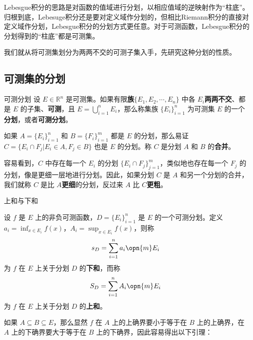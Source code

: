 

Lebesgue积分的思路是对函数的值域进行分划，以相应值域的逆映射作为“柱底”。归根到底，Lebesuge积分还是要对定义域作分划的，但相比Riemann积分的直接对定义域作分划，Lebesgue积分的分划方式更任意。对于可测函数，Lebesgue积分的分划得到的“柱底”都是可测集。

我们就从将可测集划分为两两不交的可测子集入手，先研究这种分划的性质。

\subsection{可测集的分划}

\begin{definition}{可测分划}
设 $E\in\mathbb{R}^n$ 是可测集。如果有限\textbf{族}$\{E_1, E_2, \cdots, E_n\}$ 中各 $E_i$\textbf{两两不交}、都是 $E$ 的子集、\textbf{可测}，且 $E=\bigcup^n_{i=1}E_i$，那么称集族 $\{E_i\}_{i=1}^n$ 为可测集 $E$ 的一个\textbf{分划}，或者\textbf{可测分划}。
\end{definition}

如果 $A=\{E_i\}_{i=1}^n$ 和 $B=\{F_i\}_{i=1}^m$ 都是 $E$ 的分划，那么易证 $C=\{E_i\cap F_j|E_i\in A, F_j\in B\}$ 也是 $E$ 的分划。称 $C$ 是分划 $A$ 和 $B$ 的\textbf{合并}。

容易看到，$C$ 中存在每一个 $E_i$ 的分划 $\{E_i\cap F_j\}_{j=1}^m$，类似地也存在每一个 $F_j$ 的分划，像是更细一层地进行分划。因此，如果分划 $C$ 是 $A$ 和另一个分划的合并，我们就称 $C$ 是比 $A$\textbf{更细}的分划，反过来 $A$ 比 $C$\textbf{更粗}。

\begin{definition}{上和与下和}

设 $f$ 是 $E$ 上的非负可测函数，$D=\{E_i\}_{i=1}^n$ 是 $E$ 的一个可测分划。定义 $a_i=\inf_{x\in E_i}f(x)$，$A_i=\sup_{x\in E_i}f(x)$，则称
\begin{equation}
s_D=\sum_{i=1}^n a_i \opn{m}E_i~
\end{equation}
为 $f$ 在 $E$ 上关于分划 $D$ 的\textbf{下和}，而称
\begin{equation}
S_D=\sum_{i=1}^n A_i \opn{m}E_i~
\end{equation}
为 $f$ 在 $E$ 上关于分划 $D$ 的\textbf{上和}。

\end{definition}

如果 $A\subseteq B\subseteq E$，那么显然 $f$ 在 $A$ 上的上确界要小于等于在 $B$ 上的上确界，在 $A$ 上的下确界要大于等于在 $B$ 上的下确界，因此容易得出以下引理：

